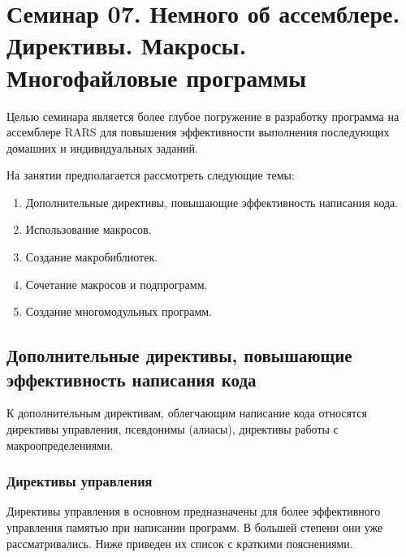 \chapter[Дополнительная информация об ассемблере RARS]{Семинар 07. Немного об ассемблере. Директивы. Макросы. Многофайловые программы}

Целью семинара является более глубое погружение в разработку программа на ассемблере RARS для повышения эффективности выполнения последующих домашних и индивидуальных заданий.


На занятии предполагается рассмотреть следующие темы:
\begin{enumerate}
    \item Дополнительные директивы, повышающие эффективность написания кода.
    \item Использование макросов.
    \item Создание макробиблиотек.
    \item Сочетание макросов и подпрограмм.
    \item Создание многомодульных программ.
\end{enumerate}

\section{Дополнительные директивы, повышающие эффективность написания кода}

К дополнительным директивам, облегчающим написание кода относятся директивы управления, псевдонимы (алиасы), директивы работы с макроопределениями.

\subsection{Директивы управления}

Директивы управления в основном предназначены для более эффективного управления памятью при написании программ. В большей степени они уже рассматривались. Ниже приведен их список с краткими пояснениями.

